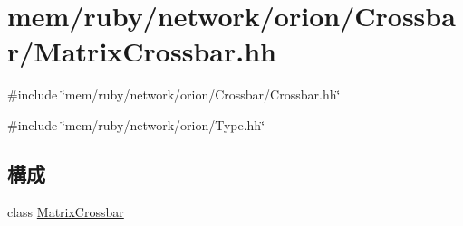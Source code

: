 \hypertarget{MatrixCrossbar_8hh}{
\section{mem/ruby/network/orion/Crossbar/MatrixCrossbar.hh}
\label{MatrixCrossbar_8hh}
}
{\ttfamily \#include \char`\"{}mem/ruby/network/orion/Crossbar/Crossbar.hh\char`\"{}}\par
{\ttfamily \#include \char`\"{}mem/ruby/network/orion/Type.hh\char`\"{}}\par
\subsection*{構成}
\begin{DoxyCompactItemize}
\item 
class \hyperlink{classMatrixCrossbar}{MatrixCrossbar}
\end{DoxyCompactItemize}

